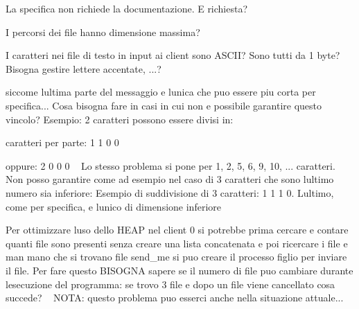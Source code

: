 
\begin{DoxyRefList}
\item[\label{warning__warning000001}%
\Hypertarget{warning__warning000001}%
File \hyperlink{client_8c}{client.c} ]La specifica non richiede la documentazione. E\textquotesingle{} richiesta?

I percorsi dei file hanno dimensione massima?

I caratteri nei file di testo in input ai client sono A\+S\+C\+II? Sono tutti da 1 byte? Bisogna gestire lettere accentate, ...?  
\item[\label{warning__warning000007}%
\Hypertarget{warning__warning000007}%
Globale \hyperlink{client_8h_a54b47b58f228d7bc9827d2919687e25a}{operazioni\+\_\+figlio} (char $\ast$file\+Path)]siccome l\textquotesingle{}ultima parte del messaggio e\textquotesingle{} l\textquotesingle{}unica che puo\textquotesingle{} essere piu\textquotesingle{} corta per specifica... Cosa bisogna fare in casi in cui non e\textquotesingle{} possibile garantire questo vincolo? Esempio\+: 2 caratteri possono essere divisi in\+:
\begin{DoxyItemize}
\item caratteri per parte\+: 1 1 0 0
\item oppure\+: 2 0 0 0 ~\newline
 Lo stesso problema si pone per 1, 2, 5, 6, 9, 10, ... caratteri. ~\newline
 Non posso garantire come ad esempio nel caso di 3 caratteri che sono l\textquotesingle{}ultimo numero sia inferiore\+: Esempio di suddivisione di 3 caratteri\+: 1 1 1 0. L\textquotesingle{}ultimo, come per specifica, e\textquotesingle{} l\textquotesingle{}unico di dimensione inferiore 
\end{DoxyItemize}
\item[\label{warning__warning000004}%
\Hypertarget{warning__warning000004}%
Globale \hyperlink{server_8c_a48d605ff689f470746c858648f0a98c2}{S\+I\+G\+I\+N\+T\+Signal\+Handler} (int sig)]Per ottimizzare l\textquotesingle{}uso dello H\+E\+AP nel client 0 si potrebbe prima cercare e contare quanti file sono presenti senza creare una lista concatenata e poi ricercare i file e man mano che si trovano file send\+\_\+me si puo\textquotesingle{} creare il processo figlio per inviare il file. Per fare questo B\+I\+S\+O\+G\+NA sapere se il numero di file puo\textquotesingle{} cambiare durante l\textquotesingle{}esecuzione del programma\+: se trovo 3 file e dopo un file viene cancellato cosa succede? ~\newline
 N\+O\+TA\+: questo problema puo\textquotesingle{} esserci anche nella situazione attuale...


\end{DoxyRefList}
